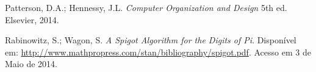 \begin{thebibliography}{1}
  		Patterson, D.A.; Hennessy, J.L.
  		\emph{Computer Organization and Design}
 		 5th ed.
		Elsevier, 2014.

    Rabinowitz, S.; Wagon, S. \emph{A Spigot Algorithm for the Digits of Pi}.
    Disponível em:
       \url{http://www.mathpropress.com/stan/bibliography/spigot.pdf}.
     Acesso em 3 de Maio de 2014.

\end{thebibliography}
